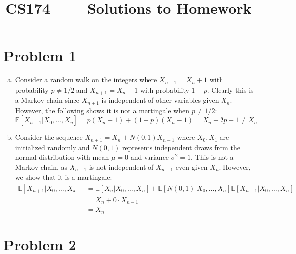 \documentclass[11pt]{article}
\title{CS174--\Session\  --- Solutions to Homework \Homework}
\author{\Name}
\newcommand{\E}{\mathbb{E}}
\begin{document}
\maketitle
{}
\setcounter{problemnumber}{0}

\section*{Problem 1}
\begin{enumerate}[(a)]
\item Consider a random walk on the integers where $X_{n+1}=X_n+1$ with probability $p\neq1/2$ and $X_{n+1}=X_n-1$ with probability $1-p$. Clearly this is a Markov chain since $X_{n+1}$ is independent of other variables given $X_n$. However, the following shows it is not a martingale when $p\neq1/2$:
$$\E[X_{n+1}|X_0,\ldots,X_n]=p(X_n+1)+(1-p)(X_n-1)=X_n+2p-1\neq X_n$$
\item Consider the sequence $X_{n+1}=X_n+N(0,1)X_{n-1}$ where $X_0,X_1$ are initialized randomly and $N(0,1)$ represents independent draws from the normal distribution with mean $\mu=0$ and variance $\sigma^2=1$. This is not a Markov chain, as $X_{n+1}$ is not independent of $X_{n-1}$ even given $X_n$. However, we show that it is a martingale:
\begin{align*}
\E[X_{n+1}|X_0,\ldots,X_n] &= \E[X_n|X_0,\ldots,X_n]+\E[N(0,1)|X_0,\ldots,X_n]\E[X_{n-1}|X_0,\ldots,X_n]\\
&= X_n + 0\cdot X_{n-1}\\
&= X_n
\end{align*}
\end{enumerate}


\newpage
\section*{Problem 2}


\newpage
\end{document}
